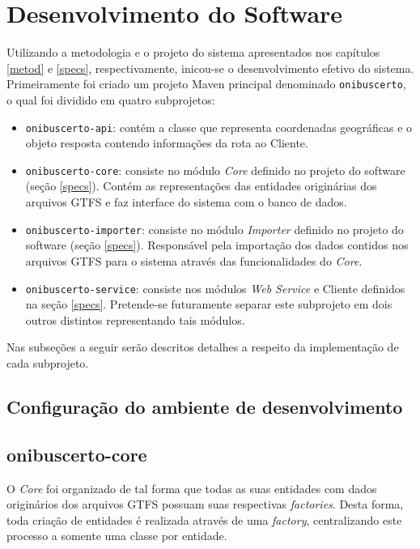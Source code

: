 \chapter{Desenvolvimento do Software}
\label{chap:desenv}

Utilizando a metodologia e o projeto do sistema apresentados nos capítulos \ref{metod} e \ref{specs}, respectivamente, inicou-se o desenvolvimento efetivo do sistema.
Primeiramente foi criado um projeto Maven principal denominado \texttt{onibuscerto}, o qual foi dividido em quatro subprojetos: 
\begin{itemize}
	\item \texttt{onibuscerto-api}: contém a classe que representa coordenadas geográficas e o objeto resposta contendo informações da rota ao Cliente.
	\item \texttt{onibuscerto-core}: consiste no módulo \emph{Core} definido no projeto do software (seção \ref{specs}). 
	Contém as representações das entidades originárias dos arquivos GTFS e faz interface do sistema com o banco de dados.
	\item \texttt{onibuscerto-importer}: consiste no módulo \emph{Importer} definido no projeto do software (seção \ref{specs}).
	Responsável pela importação dos dados contidos nos arquivos GTFS para o sistema através das funcionalidades do \emph{Core}.
	\item \texttt{onibuscerto-service}: consiste nos módulos \emph{Web Service} e Cliente definidos na seção \ref{specs}. 
	Pretende-se futuramente separar este subprojeto em dois outros distintos representando tais módulos.
\end{itemize}

Nas subseções a seguir serão descritos detalhes a respeito da implementação de cada subprojeto.

\section{Configuração do ambiente de desenvolvimento}

\section{onibuscerto-core}
O \emph{Core} foi organizado de tal forma que todas as suas entidades com dados originários dos arquivos GTFS possuam suas respectivas \emph{factories}.
Desta forma, toda criação de entidades é realizada através de uma \emph{factory}, centralizando este processo a somente uma classe por entidade.

